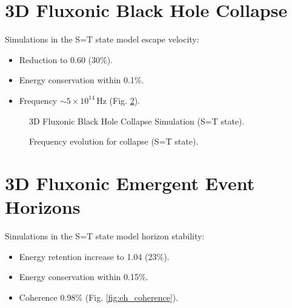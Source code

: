 \documentclass[11pt]{article}
\begin{document}
\section{3D Fluxonic Black Hole Collapse}
Simulations in the S=T state model escape velocity:
\begin{itemize}
    \item Reduction to 0.60 (30\%).
    \item Energy conservation within 0.1\%.
    \item Frequency \(\sim 5 \times 10^{14} \, \text{Hz}\) (Fig. \ref{fig:coll_freq}).
\end{itemize}

\begin{figure}[ht]
    \centering
    \caption{3D Fluxonic Black Hole Collapse Simulation (S=T state).}
    \label{fig:3Dcoll}
\end{figure}

\begin{figure}[ht]
    \centering
    \caption{Frequency evolution for collapse (S=T state).}
    \label{fig:coll_freq}
\end{figure}

\section{3D Fluxonic Emergent Event Horizons}
Simulations in the S=T state model horizon stability:
\begin{itemize}
    \item Energy retention increase to 1.04 (23\%).
    \item Energy conservation within 0.15\%.
    \item Coherence 0.98\% (Fig. \ref{fig:eh_coherence}).
\end{itemize}
\end{document}
